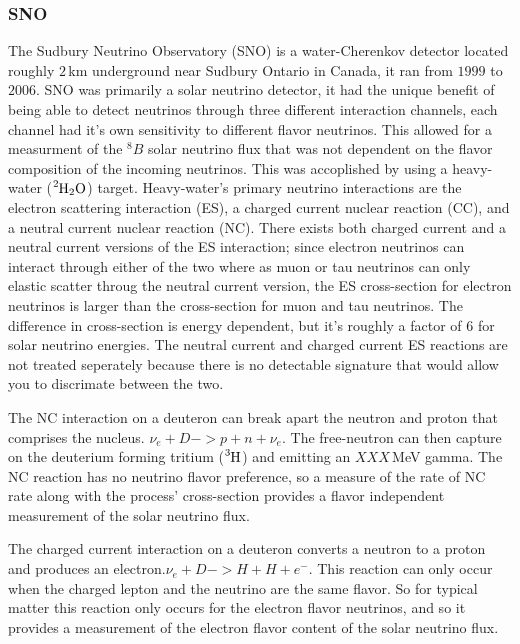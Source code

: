 \subsubsection{SNO}
\label{sec:sno}
The Sudbury Neutrino Observatory (SNO) is a water-Cherenkov detector located
roughly $2$\,km underground near Sudbury Ontario in Canada, it ran from
$1999$ to $2006$.
SNO was primarily a solar neutrino detector, it had the unique benefit of
being able to detect neutrinos through three different interaction channels,
each channel had it's own sensitivity to different flavor neutrinos.
This allowed for a measurment of the $^8B$ solar neutrino flux that was not
dependent on the flavor composition of the incoming neutrinos.
This was accoplished by using a heavy-water ($\ce{^{2}H_{2}O}$) target.
Heavy-water's primary neutrino interactions are the
electron scattering interaction (ES), a charged current nuclear reaction (CC),
and a neutral current nuclear reaction (NC).
There exists both charged current and a neutral current versions of the
ES interaction; since electron neutrinos can interact through either
of the two where as muon or tau neutrinos can only elastic scatter throug the
neutral current version, the ES cross-section for electron neutrinos is larger
than the cross-section for muon and tau neutrinos.
The difference in cross-section is energy dependent, but it's roughly a factor
of 6 for solar neutrino energies. The neutral current and charged current ES reactions
are not treated seperately because there is no detectable signature that
would allow you to discrimate between the two.

The NC interaction on a deuteron can break apart the neutron and proton
that comprises the nucleus. $\nu_{e} + D -> p + n + \nu_{e}$.
The free-neutron can then capture on the deuterium forming tritium ($\ce{^{3}H}$)
and emitting an $XXX$\,MeV gamma. %
The NC reaction has no neutrino flavor preference, so a measure of the rate
of NC rate along with the process' cross-section provides a flavor independent
measurement of the solar neutrino flux.

The charged current interaction on a deuteron converts a neutron to a
proton and produces an electron.$\nu_{e} + D -> H + H + e^{-}$.
This reaction can only occur when the charged lepton and the neutrino are the same
flavor. So for typical matter this reaction only occurs for the electron flavor
neutrinos, and so it provides a measurement of the electron flavor content
of the solar neutrino flux.

